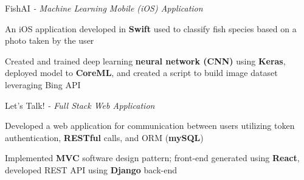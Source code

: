 \begin{siderulesProj}
\par\addvspace{-1.2ex}
\begin{cventriesproject}
  \cventryproject
  {FishAI  \hspace{0.15em}\bodyfontlight\itshape{- Machine Learning Mobile (iOS) Application}}
  {
    \begin{cvskillitems}
      \item {An iOS application developed in \textbf{Swift} used to classify fish species based on a photo taken by the user}
      \item {Created and trained deep learning \textbf{neural network (CNN)} using \textbf{Keras}, deployed model to \textbf{CoreML}, and created a script to build image dataset leveraging Bing API}
    \end{cvskillitems}
  }
  \cventryproject
    {Let's Talk!  \hspace{0.15em}\bodyfontlight\itshape{- Full Stack Web Application}}
    {
      \begin{cvskillitems}
        \item {Developed a web application for communication between users utilizing token authentication, \textbf{RESTful} calls, and ORM (\textbf{mySQL})}
        \item {Implemented \textbf{MVC} software design pattern; front-end generated using \textbf{React}, developed REST API using \textbf{Django} back-end}
      \end{cvskillitems}
    }
\end{cventriesproject}
\end{siderulesProj}
